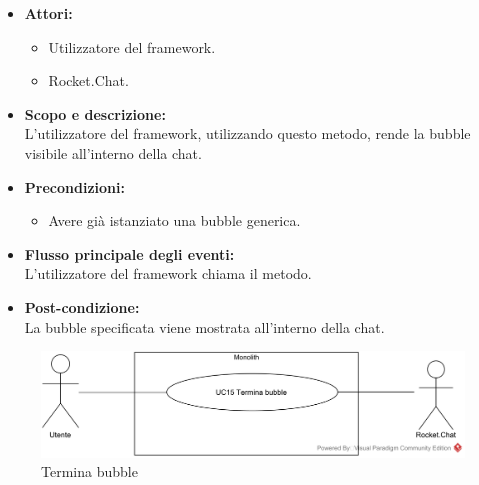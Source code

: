 \begin{itemize}
	\item \textbf{Attori:}
	\begin{itemize}
		\item Utilizzatore del framework.
		\item Rocket.Chat.
	\end{itemize}
	\item \textbf{Scopo e descrizione:} 
	\\L'utilizzatore del framework, utilizzando questo metodo, rende la bubble visibile all'interno della chat.
	\item \textbf{Precondizioni:}
	\begin{itemize}
		\item Avere già istanziato una bubble generica.
	\end{itemize}
	\item \textbf{Flusso principale degli eventi:}
	\\L'utilizzatore del framework chiama il metodo.
	\item \textbf{Post-condizione:}
	\\La bubble specificata viene mostrata all'interno della chat.
\end{itemize}


\begin{figure}[H]
	\centering
	\includegraphics[width=15cm]{../../documenti/AnalisiDeiRequisiti/Diagrammi_img/usecase/uc1_19.png}
	\caption{\UCCaption{} Termina bubble}
\end{figure}

